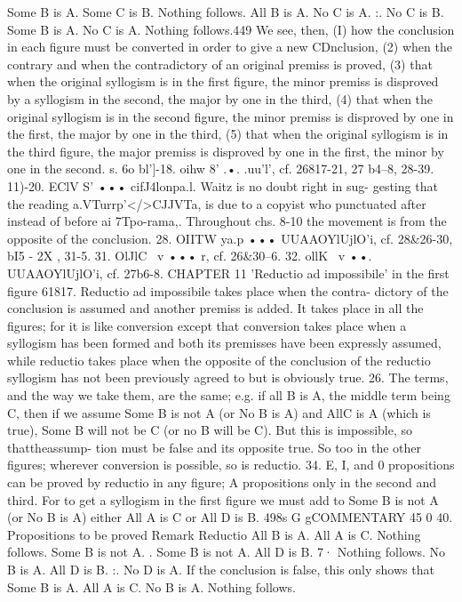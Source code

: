 {{{{Some B is A.
Some C is B.
Nothing follows.
All B is A.
No C is A.
:. No C is B.
Some B is A.
No C is A.
Nothing follows.449
We see, then, (I) how the conclusion in each figure must be
converted in order to give a new CDnclusion, (2) when the contrary
and when the contradictory of an original premiss is proved, (3)
that when the original syllogism is in the first figure, the minor
premiss is disproved by a syllogism in the second, the major by one
in the third, (4) that when the original syllogism is in the second
figure, the minor premiss is disproved by one in the first, the major
by one in the third, (5) that when the original syllogism is in the
third figure, the major premiss is disproved by one in the first,
the minor by one in the second.
s.
6o bl']-18. oihw 8' .•. .uu'l', cf. 26817-21, 27 b4--8, 28-39.
11)-20. EClV S' ••• cifJ4lonpa.l. Waitz is no doubt right in sug-
gesting that the reading a.VTurrp'</>CJJVTa, is due to a copyist who
punctuated after instead of before ai 7Tpo-rama,. Throughout chs.
8-10 the movement is from the opposite of the conclusion.
28. OIITW ya.p ••• UUAAOYlUjlO'i, cf. 28&26-30, bI5 - 2X , 31-5.
31. OlJlC ~v ••• r, cf. 26&30--6.
32. ollK ~v ••. UUAAOYlUjlO'i, cf. 27b6-8.
CHAPTER 11
'Reductio ad impossibile' in the first figure
61817. Reductio ad impossibile takes place when the contra-
dictory of the conclusion is assumed and another premiss is added.
It takes place in all the figures; for it is like conversion except
that conversion takes place when a syllogism has been formed and
both its premisses have been expressly assumed, while reductio
takes place when the opposite of the conclusion of the reductio
syllogism has not been previously agreed to but is obviously
true.
26. The terms, and the way we take them, are the same; e.g. if
all B is A, the middle term being C, then if we assume Some B is
not A (or No B is A) and AllC is A (which is true), Some B will not
be C (or no B will be C). But this is impossible, so thattheassump-
tion must be false and its opposite true. So too in the other
figures; wherever conversion is possible, so is reductio.
34. E, I, and 0 propositions can be proved by reductio in any
figure; A propositions only in the second and third. For to get a
syllogism in the first figure we must add to Some B is not A (or
No B is A) either All A is C or All D is B.
498s
G gCOMMENTARY
45 0
40. Propositions to
be proved
Remark
Reductio
All B is A.
All A is C.
}
Nothing follows.
Some B is not A. .
Some B is not A. }
All D is B.
7·
Nothing follows.
No B is A.
All D is B.
:. No D is A. } If the conclusion is false,
this only shows that
Some B is A.
All A is C.
No B is A. } Nothing follows.
